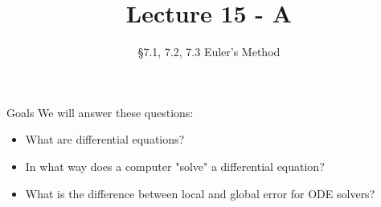 \documentclass[10pt]{beamer}
\title[Math/CS 375]{Lecture 15 - A}
\subtitle{\S 7.1, 7.2, 7.3 Euler's Method}
\begin{document}
\begin{frame}
  \titlepage
\end{frame}
\begin{frame}{Goals}
We will answer these questions:\\[3mm]
\begin{itemize}

    \item What are differential equations?
    
    \item In what way does a computer "solve" a differential equation?

    \item What is the difference between local and global error for ODE solvers?
    
\end{itemize}
\end{frame}






\end{document}
